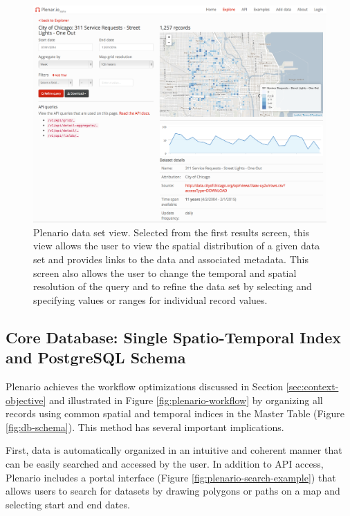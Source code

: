 \documentclass[11pt]{article}
\begin{document}
\begin{figure}
	\centering
	\label{fig:plenario-dataset-vew}
	\caption{Plenario data set view. Selected from the first results screen, this view allows the user to view the spatial distribution of a given data set and provides links to the data and associated metadata. This screen also allows the user to change the temporal and spatial resolution of the query and to refine the data set by selecting and specifying values or ranges for individual record values.\vspace{.4cm}}
	\includegraphics[scale=.25]{plenario_dataset_view.png}
\end{figure}

\subsection{\textbf{Core Database: Single Spatio-Temporal Index and PostgreSQL Schema}}\label{sec:core-database}
Plenario achieves the workflow optimizations discussed in Section \ref{sec:context-objective} and illustrated in Figure \ref{fig:plenario-workflow} by organizing all records using common spatial and temporal indices in the Master Table (Figure \ref{fig:db-schema}). This method has several important implications. 

First, data is automatically organized in an intuitive and coherent manner that can be easily searched and accessed by the user. In addition to API access, Plenario includes a portal interface (Figure \ref{fig:plenario-search-example}) that allows users to search for datasets by drawing polygons or paths on a map and selecting start and end dates. 
\end{document}
